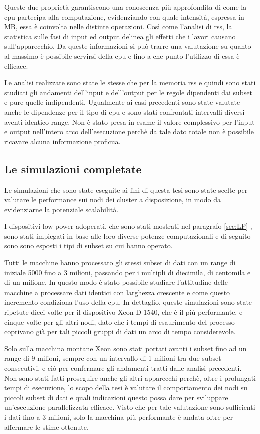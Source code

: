 Queste due proprietà garantiscono una conoscenza più approfondita di come la cpu partecipa alla computazione, evidenziando con quale intensità, espressa in MB, essa è coinvolta nelle distinte operazioni.
Così come l'analisi di rss, la statistica sulle fasi di input ed output delinea gli effetti che i lavori causano sull'apparecchio.
Da queste informazioni si può trarre una valutazione su quanto al massimo è possibile servirsi della cpu e fino a che punto l'utilizzo di essa è efficace.

Le analisi realizzate sono state le stesse che per la memoria rss e quindi sono stati studiati gli andamenti dell'input e dell'output per le regole dipendenti dai subset e pure quelle indipendenti.
Ugualmente ai casi precedenti sono state valutate anche le dipendenze per il tipo di cpu e sono stati confrontati intervalli diversi aventi identico range.
Non è stato presa in esame il valore complessivo per l'input e output nell'intero arco dell'esecuzione perchè da tale dato totale non è possibile ricavare alcuna informazione proficua.
 
\subsection{Le simulazioni completate} 
\label{subsec:simc}
Le simulazioni che sono state eseguite ai fini di questa tesi sono state scelte per valutare le performance sui nodi dei cluster a disposizione, in modo da evidenziarne la potenziale scalabilità.

I dispositivi low power adoperati, che sono stati mostrati nel paragrafo \ref{sec:LP} , sono stati impiegati in base alle loro diverse potenze computazionali e di seguito sono sono esposti i tipi di subset su cui hanno operato.

Tutti le macchine hanno processato gli stessi subset di dati con un range di iniziale 5000 fino a 3 milioni, passando per i multipli di diecimila, di centomila e di un milione.
In questo modo è stato possibile studiare l'attitudine delle macchine a processare dati identici con larghezza crescente e come questo incremento condiziona l'uso della cpu. 
In dettaglio, queste simulazioni sono state ripetute dieci volte per il dispositivo {Xeon D-1540}, che è il più performante, e cinque volte per gli altri nodi, dato che i tempi di esaurimento del processo coprivano già per tali piccoli gruppi di dati un arco di tempo considerevole.

Solo sulla macchina montane Xeon sono stati portati avanti i subset fino ad un range di 9 milioni, sempre con un intervallo di 1 milioni tra due subset consecutivi, e ciò per confermare gli andamenti tratti dalle analisi precedenti.
Non sono stati fatti proseguire anche gli altri apparecchi perchè, oltre i prolungati tempi di esecuzione, lo scopo della tesi è valutare il comportamento dei nodi su piccoli subset di dati e quali indicazioni questo possa dare per sviluppare un'esecuzione parallelizzata efficace. 
Visto che per tale valutazione sono sufficienti i dati fino a 3 milioni, solo la macchina più performante è andata oltre per affermare le stime ottenute.

